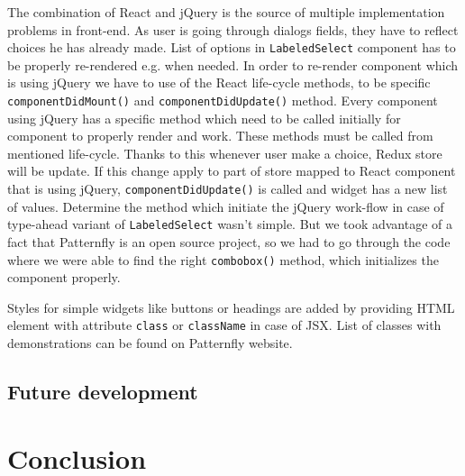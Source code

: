 The combination of React and jQuery is the source of multiple implementation problems in front-end. As user is going through dialogs fields, they have to reflect choices he has already made. List of options in \texttt{LabeledSelect} component has to be properly re-rendered e.g. when needed. In order to re-render component which is using jQuery we have to use of the React life-cycle methods, to be specific \texttt{componentDidMount()} and \texttt{componentDidUpdate()} method. Every component using jQuery has a specific method which need to be called initially for component to properly render and work. These methods must be called from mentioned life-cycle. Thanks to this whenever user make a choice, Redux store will be update. If this change apply to part of store mapped to React component that is using jQuery, \texttt{componentDidUpdate()} is called and widget has a new list of values. 
Determine the method which initiate the jQuery work-flow in case of type-ahead variant of \texttt{LabeledSelect} wasn't simple. But we took advantage of a fact that Patternfly is an open source project, so we had to go through the code where we were able to find the right \texttt{combobox()} method, which initializes the component properly.

Styles for simple widgets like buttons or headings are added by providing HTML element with attribute \texttt{class} or \texttt{className} in case of JSX. List of classes with demonstrations can be found on Patternfly website\cite{Patternfly}. 

\section{Future development}

\chapter{Conclusion}


